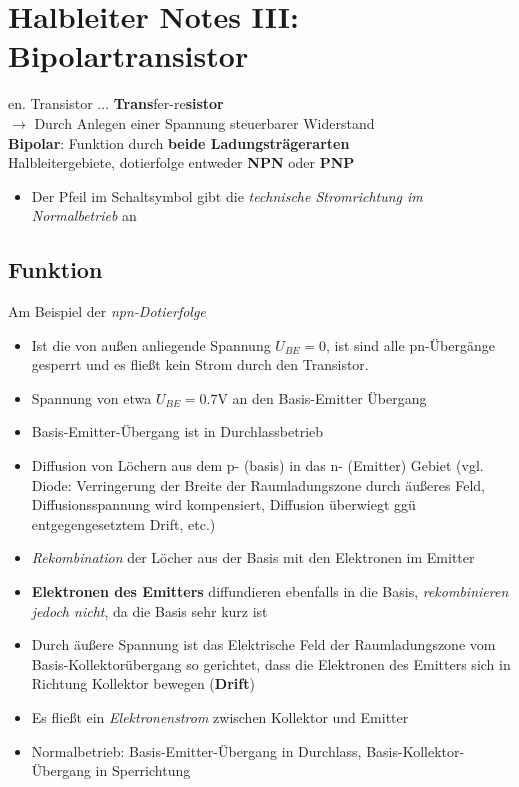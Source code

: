 \documentclass[a4paper, 12pt]{article}
\begin{document}
\section*{Halbleiter Notes III: Bipolartransistor}

en. Transistor ... \textbf{Trans}fer-re\textbf{sistor}\\

$\rightarrow$ Durch Anlegen einer Spannung steuerbarer Widerstand\\

\noindent \textbf{Bipolar}: Funktion durch \textbf{beide Ladungsträgerarten}\\

 Halbleitergebiete, dotierfolge entweder \textbf{NPN} oder \textbf{PNP}

\begin{itemize}
  \item Der Pfeil im Schaltsymbol gibt die \emph{technische Stromrichtung im
      Normalbetrieb} an
\end{itemize}

\subsection*{Funktion}

Am Beispiel der \emph{npn-Dotierfolge}
\begin{itemize}
  \item Ist die von außen anliegende Spannung $U_{BE} = 0$, ist sind alle
    pn-Übergänge gesperrt und es fließt kein Strom durch den Transistor.
  \item Spannung von etwa $U_{BE} = 0.7 \si{\volt}$ an den Basis-Emitter
    Übergang
    \item Basis-Emitter-Übergang ist in Durchlassbetrieb
  \item Diffusion von Löchern aus dem p- (basis) in das n- (Emitter) Gebiet
    (vgl. Diode: Verringerung der Breite der Raumladungszone durch äußeres Feld,
    Diffusionsspannung wird kompensiert, Diffusion überwiegt ggü
    entgegengesetztem Drift, etc.)
  \item \emph{Rekombination} der Löcher aus der Basis mit den Elektronen im Emitter 
  \item  \textbf{Elektronen des Emitters} diffundieren ebenfalls in die Basis,
    \emph{rekombinieren jedoch nicht}, da die Basis sehr kurz ist
  \item Durch äußere Spannung ist das Elektrische Feld der Raumladungszone vom
    Basis-Kollektorübergang so gerichtet, dass die Elektronen des Emitters sich
    in Richtung Kollektor bewegen (\textbf{Drift})
  \item Es fließt ein \emph{Elektronenstrom} zwischen Kollektor und Emitter
  \item Normalbetrieb: Basis-Emitter-Übergang in Durchlass,
    Basis-Kollektor-Übergang in Sperrichtung
  \end{itemize}
\end{document}
